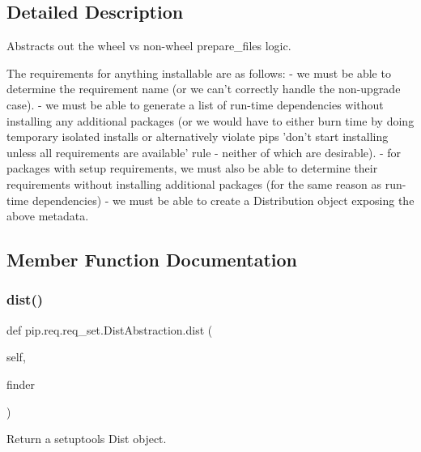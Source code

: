 \subsection{Detailed Description}
\begin{DoxyVerb}Abstracts out the wheel vs non-wheel prepare_files logic.

The requirements for anything installable are as follows:
 - we must be able to determine the requirement name
   (or we can't correctly handle the non-upgrade case).
 - we must be able to generate a list of run-time dependencies
   without installing any additional packages (or we would
   have to either burn time by doing temporary isolated installs
   or alternatively violate pips 'don't start installing unless
   all requirements are available' rule - neither of which are
   desirable).
 - for packages with setup requirements, we must also be able
   to determine their requirements without installing additional
   packages (for the same reason as run-time dependencies)
 - we must be able to create a Distribution object exposing the
   above metadata.
\end{DoxyVerb}
 

\subsection{Member Function Documentation}
\mbox{\label{classpip_1_1req_1_1req__set_1_1_dist_abstraction_a7c0a313f6747e489e8498d16dbbd20ec}} 
\subsubsection{\texorpdfstring{dist()}{dist()}}
{\footnotesize\ttfamily def pip.\+req.\+req\+\_\+set.\+Dist\+Abstraction.\+dist (\begin{DoxyParamCaption}\item[{}]{self,  }\item[{}]{finder }\end{DoxyParamCaption})}

\begin{DoxyVerb}Return a setuptools Dist object.\end{DoxyVerb}
 \mbox{\label{classpip_1_1req_1_1req__set_1_1_dist_abstraction_af4fa3f620557141cb77fbaeb9728a3b5}} 
